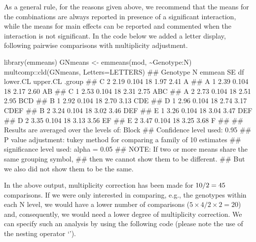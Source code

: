 \documentclass[a4paper,12pt,oneside]{book}
\newenvironment{Shaded}{\begin{snugshade}}{\end{snugshade}}
\newcommand{\SpecialCharTok}[1]{#1}
\newcommand{\DocumentationTok}[1]{#1}
\newcommand{\OtherTok}[1]{#1}
\newcommand{\FunctionTok}[1]{#1}
\newcommand{\AttributeTok}[1]{#1}
\newcommand{\AlertTok}[1]{#1}
\newcommand{\NormalTok}[1]{#1}
\begin{document}
As a general rule, for the reasons given above, we recommend that the means for the combinations are always reported in presence of a significant interaction, while the means for main effects can be reported and commented when the interaction is not significant. In the code below we added a letter display, following pairwise comparisons with multiplicity adjustment.

\vspace{12pt}

\begin{Shaded}
\begin{Highlighting}[]
\FunctionTok{library}\NormalTok{(emmeans)}
\NormalTok{GNmeans }\OtherTok{\textless{}{-}} \FunctionTok{emmeans}\NormalTok{(mod, }\SpecialCharTok{\textasciitilde{}}\NormalTok{Genotype}\SpecialCharTok{:}\NormalTok{N)}
\NormalTok{multcomp}\SpecialCharTok{::}\FunctionTok{cld}\NormalTok{(GNmeans, }\AttributeTok{Letters=}\NormalTok{LETTERS)}
\DocumentationTok{\#\#  Genotype N emmean    SE df lower.CL upper.CL .group }
\DocumentationTok{\#\#  C        2   2.19 0.104 18     1.97     2.41  A     }
\DocumentationTok{\#\#  A        1   2.39 0.104 18     2.17     2.60  AB    }
\DocumentationTok{\#\#  C        1   2.53 0.104 18     2.31     2.75  ABC   }
\DocumentationTok{\#\#  A        2   2.73 0.104 18     2.51     2.95   BCD  }
\DocumentationTok{\#\#  B        1   2.92 0.104 18     2.70     3.13    CDE }
\DocumentationTok{\#\#  D        1   2.96 0.104 18     2.74     3.17    CDEF}
\DocumentationTok{\#\#  B        2   3.24 0.104 18     3.02     3.46     DEF}
\DocumentationTok{\#\#  E        1   3.26 0.104 18     3.04     3.47     DEF}
\DocumentationTok{\#\#  D        2   3.35 0.104 18     3.13     3.56      EF}
\DocumentationTok{\#\#  E        2   3.47 0.104 18     3.25     3.68       F}
\DocumentationTok{\#\# }
\DocumentationTok{\#\# Results are averaged over the levels of: Block }
\DocumentationTok{\#\# Confidence level used: 0.95 }
\DocumentationTok{\#\# P value adjustment: tukey method for comparing a family of 10 estimates }
\DocumentationTok{\#\# significance level used: alpha = 0.05 }
\DocumentationTok{\#\# }\AlertTok{NOTE}\DocumentationTok{: If two or more means share the same grouping symbol,}
\DocumentationTok{\#\#       then we cannot show them to be different.}
\DocumentationTok{\#\#       But we also did not show them to be the same.}
\end{Highlighting}
\end{Shaded}

In the above output, multiplicity correction has been made for \(10 \time 9 / 2 = 45\) comparisons. If we were only interested in comparing, e.g., the genotypes within each N level, we would have a lower number of comparisons (\(5 \times 4/2 \times 2 = 20\)) and, consequently, we would need a lower degree of multiplicity correction. We can specify such an analysis by using the following code (please note the use of the nesting operator `\textbar{}').
\end{document}
